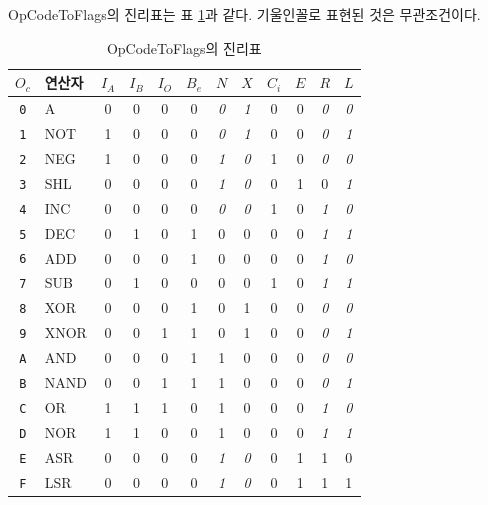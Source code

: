 \documentclass{article}
\renewcommand{\tablename}{표}
\begin{document}
OpCodeToFlags의 진리표는 \tablename{} \ref{tab:octf}과 같다.
기울인꼴로 표현된 것은 무관조건이다.

\begin{table}[h]
    \centering
    \begin{tabular}{cl||ccccccc|ccc}
        $O_c$ & 연산자 & $I_A$ & $I_B$ & $I_O$ & $B_e$ & $N$ & $X$ & $C_i$ & $E$ & $R$ & $L$ \\
        \hline
        \texttt{0} & A    & 0 & 0 & 0 & 0 & \textit 0 & \textit 1 & 0 & 0 & \textit 0 & \textit 0 \\
        \texttt{1} & NOT  & 1 & 0 & 0 & 0 & \textit 0 & \textit 1 & 0 & 0 & \textit 0 & \textit 1 \\
        \texttt{2} & NEG  & 1 & 0 & 0 & 0 & \textit 1 & \textit 0 & 1 & 0 & \textit 0 & \textit 0 \\
        \texttt{3} & SHL  & 0 & 0 & 0 & 0 & \textit 1 & \textit 0 & 0 & 1 & 0 & \textit 1\\
        \texttt{4} & INC  & 0 & 0 & 0 & 0 & \textit 0 & \textit 0 & 1 & 0 & \textit 1& \textit 0 \\
        \texttt{5} & DEC  & 0 & 1 & 0 & 1 & 0 & 0 & 0 & 0 & \textit 1& \textit 1\\
        \texttt{6} & ADD  & 0 & 0 & 0 & 1 & 0 & 0 & 0 & 0 & \textit 1& \textit 0 \\
        \texttt{7} & SUB  & 0 & 1 & 0 & 0 & 0 & 0 & 1 & 0 & \textit 1& \textit 1\\
        \texttt{8} & XOR  & 0 & 0 & 0 & 1 & 0 & 1 & 0 & 0 & \textit 0 & \textit 0 \\
        \texttt{9} & XNOR & 0 & 0 & 1 & 1 & 0 & 1 & 0 & 0 & \textit 0 & \textit 1\\
        \texttt{A} & AND  & 0 & 0 & 0 & 1 & 1 & 0 & 0 & 0 & \textit 0 & \textit 0 \\
        \texttt{B} & NAND & 0 & 0 & 1 & 1 & 1 & 0 & 0 & 0 & \textit 0 & \textit 1\\
        \texttt{C} & OR   & 1 & 1 & 1 & 0 & 1 & 0 & 0 & 0 & \textit 1& \textit 0 \\
        \texttt{D} & NOR  & 1 & 1 & 0 & 0 & 1 & 0 & 0 & 0 & \textit 1& \textit 1\\
        \texttt{E} & ASR  & 0 & 0 & 0 & 0 & \textit 1& \textit 0 & 0 & 1 & 1 & 0 \\
        \texttt{F} & LSR  & 0 & 0 & 0 & 0 & \textit 1& \textit 0 & 0 & 1 & 1 & 1 \\
    \end{tabular}
    \caption{OpCodeToFlags의 진리표}
    \label{tab:octf}
\end{table}
\end{document}
